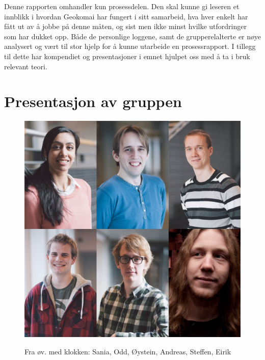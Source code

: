 \documentclass[a4paper,norsk,oneside]{article}
\begin{document}
Denne rapporten omhandler kun prosessdelen. Den skal kunne gi leseren et innblikk i hvordan Geokomai har fungert i sitt samarbeid, hva hver enkelt har fått ut av å jobbe på denne måten, og sist men ikke minst hvilke utfordringer som har dukket opp. Både de personlige loggene, samt de grupperelalterte er nøye analysert og vært til stor hjelp for å kunne utarbeide en prosessrapport. I tillegg til dette har kompendiet og presentasjoner i emnet hjulpet oss med å ta i bruk relevant teori.

\clearpage

\section{Presentasjon av gruppen}
\begin{figure}[H]
\centering
\includegraphics[scale=0.25]{figs/gruppebildegeokomai}
\label{gmaps1}
\caption{Fra øv. med klokken: Sania, Odd, Øystein, Andreas, Steffen, Eirik}
\end{figure}
\end{document}
